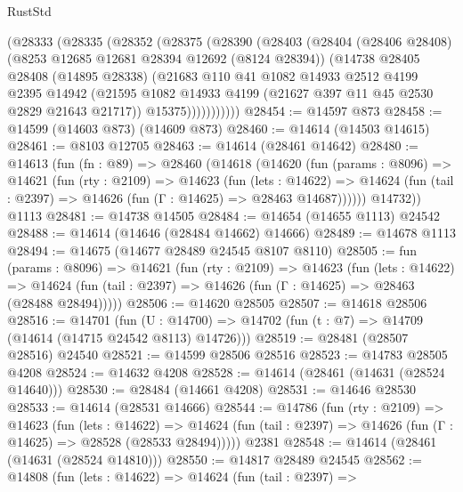 \begin{lexlean}{RustStd}
\begin{coremodule}
        (@28333
          (@28335
            (@28352
              (@28375
                (@28390
                  (@28403
                    (@28404
                      (@28406 @28408)
                      (@8253 @12685 @12681 @28394 @12692 (@8124 @28394))
                      (@14738
                        @28405
                        @28408
                        (@14895 @28338)
                        (@21683
                          @110
                          @41
                          @1082
                          @14933
                          @2512
                          @4199
                          @2395
                          @14942
                          (@21595
                            @1082
                            @14933
                            @4199
                            (@21627 @397 @11 @45 @2530 @2829 @21643 @21717))
                          @15375)))))))))))
@28454 := @14597 @873
@28458 := @14599 (@14603 @873) (@14609 @873)
@28460 := @14614 (@14503 @14615)
@28461 := @8103 @12705
@28463 := @14614 (@28461 @14642)
@28480 := @14613
    (fun (fn : @89) =>
    @28460
      (@14618
        (@14620
          (fun (params : @8096) =>
          @14621
            (fun (rty : @2109) =>
            @14623
              (fun (lets : @14622) =>
              @14624 (fun (tail : @2397) => @14626 (fun (Γ : @14625) => @28463 @14687))))))
        @14732))
    @1113
@28481 := @14738 @14505
@28484 := @14654 (@14655 @1113) @24542
@28488 := @14614 (@14646 (@28484 @14662) @14666)
@28489 := @14678 @1113
@28494 := @14675 (@14677 @28489 @24545 @8107 @8110)
@28505 := fun (params : @8096) =>
  @14621
    (fun (rty : @2109) =>
    @14623
      (fun (lets : @14622) =>
      @14624 (fun (tail : @2397) => @14626 (fun (Γ : @14625) => @28463 (@28488 @28494)))))
@28506 := @14620 @28505
@28507 := @14618 @28506
@28516 := @14701
    (fun (U : @14700) => @14702 (fun (t : @7) => @14709 (@14614 (@14715 @24542 @8113) @14726)))
@28519 := @28481 (@28507 @28516) @24540
@28521 := @14599 @28506 @28516
@28523 := @14783 @28505 @4208
@28524 := @14632 @4208
@28528 := @14614 (@28461 (@14631 (@28524 @14640)))
@28530 := @28484 (@14661 @4208)
@28531 := @14646 @28530
@28533 := @14614 (@28531 @14666)
@28544 := @14786
    (fun (rty : @2109) =>
    @14623
      (fun (lets : @14622) =>
      @14624 (fun (tail : @2397) => @14626 (fun (Γ : @14625) => @28528 (@28533 @28494)))))
    @2381
@28548 := @14614 (@28461 (@14631 (@28524 @14810)))
@28550 := @14817 @28489 @24545
@28562 := @14808
    (fun (lets : @14622) =>
    @14624
      (fun (tail : @2397) =>

\end{coremodule}
\end{lexlean}
